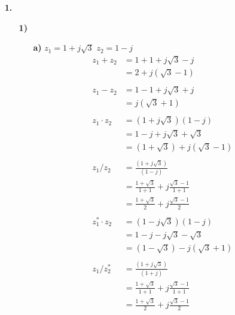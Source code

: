 \documentclass[a4paper,11pt]{article}
\author{\authorinfotitle}
\title{\titleinfo}
\date{\today}
\begin{document}
	\maketitle
	\begin{enumerate}
		\item[\textbf{1.}]
		\begin{enumerate}
			\item[\textbf{1)}]
			\begin{enumerate}
			\item[\textbf{a)}] $z_1 = 1+j\sqrt{3}$ $z_2=1-j$
			\begin{align*}
			z_1+z_2 &= 1+1+j\sqrt{3}-j \\
					&= 2+j(\sqrt{3}-1) \\\\
			z_1-z_2 &= 1-1+j\sqrt{3}+j \\
					&= j(\sqrt{3}+1)\\\\
			z_1 \cdot z_2 &= (1+j\sqrt{3})(1-j) \\
			              &= 1-j+j\sqrt{3}+\sqrt{3} \\
			              &= (1+\sqrt{3})+j(\sqrt{3}-1)\\\\
			z_1 / z_2 &= \frac{(1+j\sqrt{3})}{(1-j)} \\
			          &= \frac{1+\sqrt{3}}{1+1}+j\frac{\sqrt{3}-1}{1+1} \\
			          &= \frac{1+\sqrt{3}}{2}+j\frac{\sqrt{3}-1}{2}\\\\
			z_1^* \cdot z_2 &= (1-j\sqrt{3})(1-j) \\
			              &= 1-j-j\sqrt{3}-\sqrt{3} \\
			              &= (1-\sqrt{3})-j(\sqrt{3}+1)\\\\
			z_1 / z_2^* &= \frac{(1+j\sqrt{3})}{(1+j)} \\
			            &= \frac{1+\sqrt{3}}{1+1}+j\frac{\sqrt{3}-1}{1+1} \\
			            &= \frac{1+\sqrt{3}}{2}+j\frac{\sqrt{3}-1}{2}
			\end{align*}
			

\end{enumerate}
\end{enumerate}
\end{enumerate}
\end{document}
